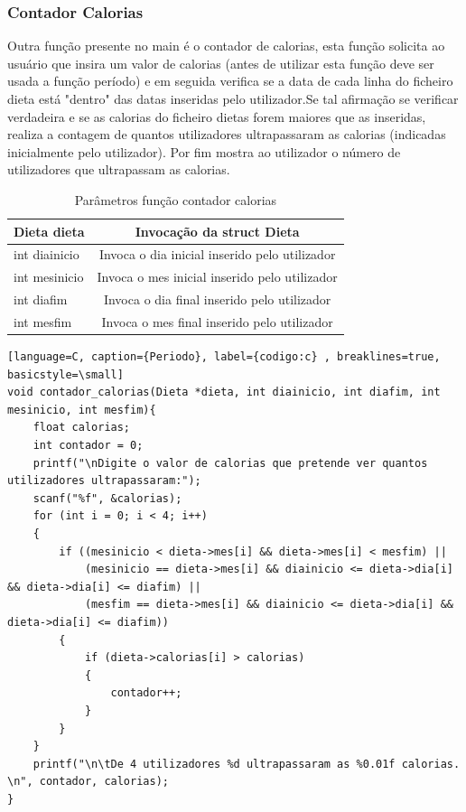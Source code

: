 \documentclass[a4wide]{report}
\begin{document}
\subsubsection{Contador Calorias }
Outra função presente no main é o contador de calorias, esta função solicita ao usuário que insira um valor de calorias (antes de utilizar esta função deve ser usada a função período) e em seguida verifica se a data de cada linha do ficheiro dieta está "dentro" das datas inseridas pelo utilizador.Se tal afirmação se verificar verdadeira e se as calorias do ficheiro dietas forem maiores que as inseridas, realiza a contagem de quantos utilizadores ultrapassaram as calorias (indicadas inicialmente pelo utilizador). Por fim mostra ao utilizador o número de utilizadores que ultrapassam as calorias.
\begin{table}[h]
    \centering
       \caption{Parâmetros função contador calorias} 
    \begin{tabular}{|l|c|}\hline
 Dieta dieta&Invocação da struct Dieta\\\hline  
         int diainicio& Invoca o dia inicial inserido pelo utilizador\\ \hline  
         int mesinicio& Invoca o mes inicial inserido pelo utilizador\\ \hline  
         int diafim& Invoca o dia final inserido pelo utilizador\\ \hline  
         int mesfim& Invoca o mes final inserido pelo utilizador\\ \hline 
    \end{tabular}
\end{table}
\begin{lstlisting}[language=C, caption={Periodo}, label={codigo:c} , breaklines=true, basicstyle=\small]
void contador_calorias(Dieta *dieta, int diainicio, int diafim, int mesinicio, int mesfim){
    float calorias;
    int contador = 0;
    printf("\nDigite o valor de calorias que pretende ver quantos utilizadores ultrapassaram:");
    scanf("%f", &calorias);
    for (int i = 0; i < 4; i++)
    {
        if ((mesinicio < dieta->mes[i] && dieta->mes[i] < mesfim) ||
            (mesinicio == dieta->mes[i] && diainicio <= dieta->dia[i] && dieta->dia[i] <= diafim) ||
            (mesfim == dieta->mes[i] && diainicio <= dieta->dia[i] && dieta->dia[i] <= diafim))
        {
            if (dieta->calorias[i] > calorias)
            {
                contador++;
            }
        }
    }
    printf("\n\tDe 4 utilizadores %d ultrapassaram as %0.01f calorias. \n", contador, calorias);
}
\end{lstlisting}
\end{document}
